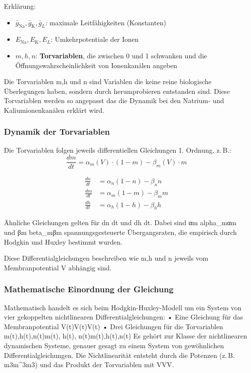 \begin{refsection}
Erklärung:

\begin{itemize}
	\item $\bar{g}_{\text{Na}}, \bar{g}_{\text{K}}, \bar{g}_L$: maximale Leitfähigkeiten (Konstanten)
	\item $E_{\text{Na}}, E_{\text{K}}, E_L$: Umkehrpotentiale der Ionen
	\item $m, h, n$: \textbf{Torvariablen}, die zwischen 0 und 1 schwanken und die Öffnungswahrscheinlichkeit von Ionenkanälen angeben
\end{itemize}
Die Torvariablen m,h und n sind Variablen die keine reine biologische Überlegungen haben, sondern durch herumprobieren entstanden sind. Diese Torvariablen werden so angepasst das die Dynamik bei den Natrium- und Kaliumionenkanälen erklärt wird.
\subsubsection{Dynamik der Torvariablen}
Die Torvariablen folgen jeweils differentiellen Gleichungen 1. Ordnung, z. B.:
\[
\frac{dm}{dt} = \alpha_m(V) \cdot (1 - m) - \beta_m(V) \cdot m
\]

\begin{align}
	\frac{dn}{dt} &= \alpha_n (1 - n) - \beta_n n \tag{3.11} \\
	\frac{dm}{dt} &= \alpha_m (1 - m) - \beta_m m \tag{3.12} \\
	\frac{dh}{dt} &= \alpha_h (1 - h) - \beta_h h \tag{3.13}
\end{align}

Ähnliche Gleichungen gelten für dn dt und dh dt. Dabei sind αm alpha_mαm und βm beta_mβm spannungsgesteuerte Übergangsraten, die empirisch durch Hodgkin und Huxley bestimmt wurden.

Diese Differentialgleichungen beschreiben wie m,h und n jeweils vom Membranpotential V abhängig sind.
\subsubsection{Mathematische Einordnung der Gleichung}
Mathematisch handelt es sich beim Hodgkin-Huxley-Modell um ein System von vier gekoppelten nichtlinearen Differentialgleichungen:
•	Eine Gleichung für das Membranpotential V(t)V(t)V(t)
•	Drei Gleichungen für die Torvariablen m(t),h(t),n(t)m(t), h(t), n(t)m(t),h(t),n(t)
Es gehört zur Klasse der nichtlinearen dynamischen Systeme, genauer gesagt zu einem System von gewöhnlichen Differentialgleichungen. Die Nichtlinearität entsteht durch die Potenzen (z. B. m3m^3m3) und das Produkt der Torvariablen mit VVV.

\end{refsection}
